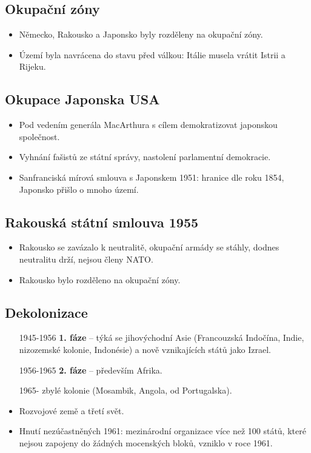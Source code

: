 \documentclass{article}
\begin{document}
\subsection*{Okupační zóny}
\begin{itemize}
    \item Německo, Rakousko a Japonsko byly rozděleny na okupační zóny.
    \item Území byla navrácena do stavu před válkou: Itálie musela vrátit Istrii a Rijeku.
\end{itemize}

\subsection*{Okupace Japonska USA}
\begin{itemize}
    \item Pod vedením generála MacArthura s cílem demokratizovat japonskou společnost.
    \item Vyhnání fašistů ze státní správy, nastolení parlamentní demokracie.
    \item Sanfranciská mírová smlouva s Japonskem 1951: hranice dle roku 1854, Japonsko přišlo o mnoho území.
\end{itemize}

\subsection*{Rakouská státní smlouva 1955}
\begin{itemize}
    \item Rakousko se zavázalo k neutralitě, okupační armády se stáhly, dodnes neutralitu drží, nejsou členy NATO.
    \item Rakousko bylo rozděleno na okupační zóny.
\end{itemize}

\subsection*{Dekolonizace}
\begin{itemize}
    \item[1945-1956] \textbf{1. fáze} – týká se jihovýchodní Asie (Francouzská Indočína, Indie, nizozemské kolonie, Indonésie) a nově vznikajících států jako Izrael.
    \item[1956-1965] \textbf{2. fáze} – především Afrika.
    \item[1965-] zbylé kolonie (Mosambik, Angola, od Portugalska).
    \item Rozvojové země a třetí svět.
    \item Hnutí nezúčastněných 1961: mezinárodní organizace více než 100 států, které nejsou zapojeny do žádných mocenských bloků, vzniklo v roce 1961.
\end{itemize}
\end{document}
